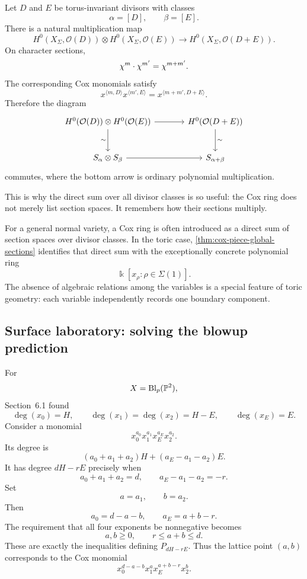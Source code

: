 Let \(D\) and \(E\) be torus-invariant divisors with classes
\[
\alpha=[D],
\qquad
\beta=[E].
\]
There is a natural multiplication map
\[
H^0(X_\Sigma,\mathcal O(D))
\otimes
H^0(X_\Sigma,\mathcal O(E))
\longrightarrow
H^0(X_\Sigma,\mathcal O(D+E)).
\]
On character sections,
\[
\character m\cdot\character{m'}
=
\character{m+m'}.
\]
The corresponding Cox monomials satisfy
\[
x^{\langle m,D\rangle}
 x^{\langle m',E\rangle}
=
x^{\langle m+m',D+E\rangle}.
\]
Therefore the diagram
\[
\begin{tikzcd}[column sep=large,row sep=large]
H^0(\mathcal O(D))\otimes H^0(\mathcal O(E))
  \arrow[r]
  \arrow[d,"\sim"']
&
H^0(\mathcal O(D+E))
  \arrow[d,"\sim"]
\\
S_\alpha\otimes S_\beta
  \arrow[r]
&
S_{\alpha+\beta}
\end{tikzcd}
\]
commutes, where the bottom arrow is ordinary polynomial
multiplication.

This is why the direct sum over all divisor classes is so useful: the
Cox ring does not merely list section spaces. It remembers how their
sections multiply.

\begin{observation}
For a general normal variety, a Cox ring is often introduced as a
direct sum of section spaces over divisor classes. In the toric case,
\cref{thm:cox-piece-global-sections} identifies that direct sum with
the exceptionally concrete polynomial ring
\[
\Bbbk[x_\rho:\rho\in\Sigma(1)].
\]
The absence of algebraic relations among the variables is a special
feature of toric geometry: each variable independently records one
boundary component.
\end{observation}

\subsection{Surface laboratory: solving the blowup prediction}

For
\[
X=\Blp{\PP^2}{p},
\]
Section~6.1 found
\[
\deg(x_0)=H,
\qquad
\deg(x_1)=\deg(x_2)=H-E,
\qquad
\deg(x_E)=E.
\]
Consider a monomial
\[
x_0^{a_0}x_1^{a_1}x_E^{a_E}x_2^{a_2}.
\]
Its degree is
\[
(a_0+a_1+a_2)H
+
(a_E-a_1-a_2)E.
\]
It has degree \(dH-rE\) precisely when
\[
a_0+a_1+a_2=d,
\qquad
 a_E-a_1-a_2=-r.
\]
Set
\[
a=a_1,
\qquad
b=a_2.
\]
Then
\[
a_0=d-a-b,
\qquad
 a_E=a+b-r.
\]
The requirement that all four exponents be nonnegative becomes
\[
a,b\geq0,
\qquad
r\leq a+b\leq d.
\]
These are exactly the inequalities defining \(P_{dH-rE}\). Thus the
lattice point \((a,b)\) corresponds to the Cox monomial
\[
\boxed{
x_0^{d-a-b}x_1^a x_E^{a+b-r}x_2^b.
}
\]

